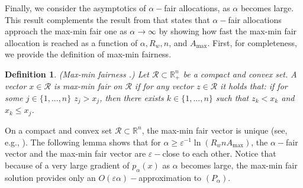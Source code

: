 \documentclass[11pt]{article}
\newcommand{\wratio}{R_w}
\newtheorem{definition}[theorem]{Definition}
\begin{document}
Finally, we consider the asymptotics of $\alpha-$fair allocations, as $\alpha$ becomes large. This result complements the result from \cite{MoWalrand2000} that states that $\alpha-$fair allocations approach the max-min fair one as $\alpha\rightarrow \infty$ by showing how fast the max-min fair allocation is reached as a function of $\alpha, \wratio, n$, and $A_{\max}$. First, for completeness, we provide the definition of max-min fairness.
\begin{definition}(Max-min fairness \cite{Bertsekas:1987:DN:12517}.) \label{def:max-min-fairness}
Let $\mathcal{R}\subset \mathbb{R}_+^n$ be a compact and convex set. A vector $x\in \mathcal{R}$ is max-min fair on $\mathcal{R}$ if for any vector $z\in \mathcal{R}$ it holds that: if for some $j\in\{1,...,n\}$ $z_j > x_j$, then there exists $k\in\{1,...,n\}$ such that $z_k < x_k$ and $x_k \leq x_j$. 
\end{definition}
On a compact and convex set $\mathcal{R}\subset \mathbb{R}^n$, the max-min fair vector is unique (see, e.g., \cite{Sarkar-Tassiulas, radunovic2007unified}). The following lemma shows that for $\alpha \geq \varepsilon^{-1}\ln(\wratio n A_{\max})$, the $\alpha-$fair vector and the max-min fair vector are $\varepsilon-$close to each other. Notice that because of a very large gradient of $p_\alpha(x)$ as $\alpha$ becomes large, the max-min fair solution provides only an $O(\varepsilon\alpha)-$approximation to $(P_\alpha)$. 
\end{document}
